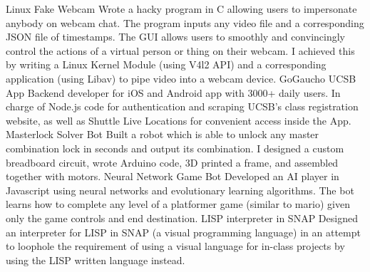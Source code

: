 


\begin{cvskills}

  \vspace{1mm}
  \cvskill 
    {Linux Fake Webcam} %
    {Wrote a hacky program in C allowing users to impersonate anybody on webcam chat. The program inputs any video file and a corresponding JSON file of timestamps. The GUI allows users to smoothly and convincingly control the actions of a virtual person or thing on their webcam. I achieved this by writing a Linux Kernel Module (using V4l2 API) and a corresponding application (using Libav) to pipe video into a webcam device.} %
  \vspace{1mm}
  \cvskill
    {GoGaucho UCSB App} %
    {Backend developer for iOS and Android app with 3000+ daily users. In charge of Node.js code for authentication and scraping UCSB's class registration website, as well as Shuttle Live Locations for convenient access inside the App.} %
\cvskill
    {Masterlock Solver Bot} %
    {Built a robot which is able to unlock any master combination lock in seconds and output its combination. I designed a custom breadboard circuit, wrote Arduino code, 3D printed a frame, and assembled together with motors.} %
  \vspace{1mm}
\cvskill
  {Neural Network Game Bot}
  {Developed an AI player in Javascript using neural networks and evolutionary learning algorithms. The bot learns how to complete any level of a platformer game (similar to mario) given only the game controls and end destination.}
  \vspace{1mm}
  \cvskill
    {LISP interpreter in SNAP} %
    {Designed an interpreter for LISP in SNAP (a visual programming language) in an attempt to loophole the requirement of using a visual language for in-class projects by using the LISP written language instead.} %
  \vspace{1mm}

\end{cvskills}
